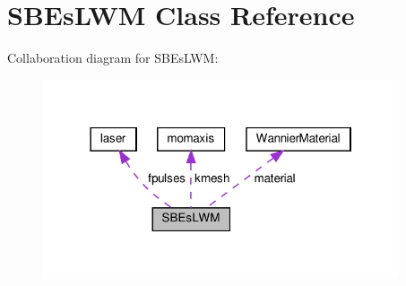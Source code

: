 \hypertarget{class_s_b_es_l_w_m}{}\section{S\+B\+Es\+L\+WM Class Reference}
\label{class_s_b_es_l_w_m}


Collaboration diagram for S\+B\+Es\+L\+WM\+:\nopagebreak
\begin{figure}[H]
\begin{center}
\leavevmode
\includegraphics[width=298pt]{class_s_b_es_l_w_m__coll__graph}
\end{center}
\end{figure}
